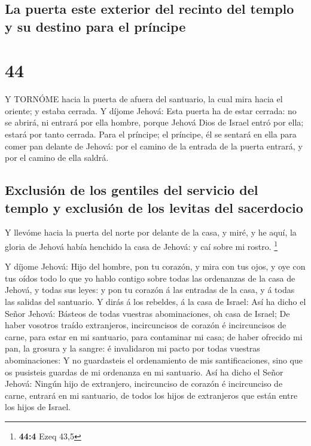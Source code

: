 \hypertarget{la-puerta-este-exterior-del-recinto-del-templo-y-su-destino-para-el-pruxedncipe}{%
\subsection{La puerta este exterior del recinto del templo y su destino
para el
príncipe}\label{la-puerta-este-exterior-del-recinto-del-templo-y-su-destino-para-el-pruxedncipe}}

\hypertarget{section-43}{%
\section{44}\label{section-43}}

 Y TORNÓME hacia la puerta de afuera del santuario, la cual
mira hacia el oriente; y estaba cerrada.  Y díjome Jehová:
Esta puerta ha de estar cerrada: no se abrirá, ni entrará por ella
hombre, porque Jehová Dios de Israel entró por ella; estará por tanto
cerrada.  Para el príncipe; el príncipe, él se sentará en
ella para comer pan delante de Jehová: por el camino de la entrada de la
puerta entrará, y por el camino de ella saldrá.

\hypertarget{exclusiuxf3n-de-los-gentiles-del-servicio-del-templo-y-exclusiuxf3n-de-los-levitas-del-sacerdocio}{%
\subsection{Exclusión de los gentiles del servicio del templo y
exclusión de los levitas del
sacerdocio}\label{exclusiuxf3n-de-los-gentiles-del-servicio-del-templo-y-exclusiuxf3n-de-los-levitas-del-sacerdocio}}

 Y llevóme hacia la puerta del norte por delante de la casa,
y miré, y he aquí, la gloria de Jehová había henchido la casa de Jehová:
y caí sobre mi rostro. \footnote{\textbf{44:4} Ezeq 43,5}

 Y díjome Jehová: Hijo del hombre, pon tu corazón, y mira
con tus ojos, y oye con tus oídos todo lo que yo hablo contigo sobre
todas las ordenanzas de la casa de Jehová, y todas sus leyes: y pon tu
corazón á las entradas de la casa, y á todas las salidas del santuario.
 Y dirás á los rebeldes, á la casa de Israel: Así ha dicho
el Señor Jehová: Básteos de todas vuestras abominaciones, oh casa de
Israel;  De haber vosotros traído extranjeros, incircuncisos
de corazón é incircuncisos de carne, para estar en mi santuario, para
contaminar mi casa; de haber ofrecido mi pan, la grosura y la sangre: é
invalidaron mi pacto por todas vuestras abominaciones:  Y no
guardasteis el ordenamiento de mis santificaciones, sino que os
pusisteis guardas de mi ordenanza en mi santuario.  Así ha
dicho el Señor Jehová: Ningún hijo de extranjero, incircunciso de
corazón é incircunciso de carne, entrará en mi santuario, de todos los
hijos de extranjeros que están entre los hijos de Israel.

